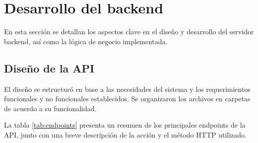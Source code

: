 \section{Desarrollo del backend}

En esta sección se detallan los aspectos clave en el diseño y desarrollo del
servidor backend, así como la lógica de negocio implementada.

\subsection{Diseño de la API}

El diseño se estructuró en base a las necesidades del sistema y los
requerimientos funcionales y no funcionales establecidos. Se organizaron los
archivos en carpetas de acuerdo a su funcionalidad. %

La tabla \ref{tab:endpoints} presenta un resumen de los principales endpoints
de la API, junto con una breve descripción de la acción y el método HTTP
utilizado.

